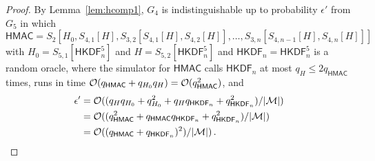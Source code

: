 \documentclass[compsoc, conference, letterpaper, 10pt, times]{IEEEtran}
\newcommand{\HKDF}{\mathsf{HKDF}}
\newcommand{\hmac}{\mathsf{HMAC}}
\newcommand{\Smac}{\mathcal{M}}
\newcommand{\ab}{\allowbreak}
\begin{document}
\begin{proof}
By Lemma~\ref{lem:hcomp1}, 
$G_4$ is indistinguishable up to probability $\epsilon'$
from $G_5$ in which
$\hmac = S_2[H_0, \ab S_{4,1}[H], \ab S_{3,2}[S_{4,1}[H], S_{4,2}[H]], \ab \dots, \ab S_{3,n}[S_{4,n-1}[H], S_{4,n}[H]]]$ with $H_0 = S_{5,1}[\HKDF^5_n]$ and $H = S_{5,2}[\HKDF^5_n]$
and $\HKDF_n = \HKDF^5_n$  is a random oracle, where
the simulator for $\hmac$ calls $\HKDF_n$ at most $q_H \leq 2 q_{\hmac}$ times,
runs in time ${\cal O}(q_{\hmac} + q_{H_0} q_H) = {\cal O}(q_{\hmac}^2)$,
and 
\begin{align*}
\epsilon' &= {\cal O}((q_H q_{H_0} + q_{H_0}^2 + q_H q_{\HKDF_n} + q_{\HKDF_n}^2)/|\Smac|)\\
& = {\cal O}((q_{\hmac}^2 + q_{\hmac}q_{\HKDF_n} + q_{\HKDF_n}^2)/|\Smac|) \\
&= {\cal O}((q_{\hmac} + q_{\HKDF_n})^2)/|\Smac|)\,.
\end{align*}


\end{proof}
\end{document}
